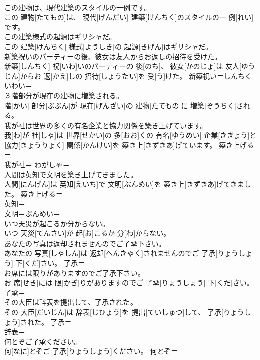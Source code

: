 \documentclass[8pt]{extreport}
\begin{document}
\begin{CJK}{UTF8}{min}
\\	この建物は、現代建築のスタイルの一例です。	
\\	この 建物[たてもの]は、 現代[げんだい] 建築[けんちく]のスタイルの一 例[れい]です。	
\\	この建築様式の起源はギリシャだ。	
\\	この 建築[けんちく] 様式[ようしき]の 起源[きげん]はギリシャだ。	
\\	新築祝いのパーティーの後、彼女は友人からお返しの招待を受けた。	
\\	新築[しんちく] 祝[いわ]いのパーティーの 後[のち]、 彼女[かのじょ]は 友人[ゆうじん]からお 返[かえ]しの 招待[しょうたい]を 受[う]けた。	新築祝い＝しんちくいわい＝ 
\\	３階部分が現在の建物に増築される。	
\\	階[かい] 部分[ぶぶん]が 現在[げんざい]の 建物[たてもの]に 増築[ぞうちく]される。	
\\	我が社は世界の多くの有名企業と協力関係を築き上げています。	
\\	我[わ]が 社[しゃ]は 世界[せかい]の 多[おお]くの 有名[ゆうめい] 企業[きぎょう]と 協力[きょうりょく] 関係[かんけい]を 築き上[きずきあ]げています。	築き上げる＝ 
\\	我が社＝ わがしゃ＝ 
\\	人間は英知で文明を築き上げてきました。	
\\	人間[にんげん]は 英知[えいち]で 文明[ぶんめい]を 築き上[きずきあ]げてきました。	築き上げる＝ 
\\	英知＝ 
\\	文明＝ぶんめい＝ 
\\	いつ天災が起こるか分からない。	
\\	いつ 天災[てんさい]が 起[お]こるか 分[わ]からない。	
\\	あなたの写真は返却されませんのでご了承下さい。	
\\	あなたの 写真[しゃしん]は 返却[へんきゃく]されませんのでご 了承[りょうしょう] 下[くだ]さい。	了承＝ 
\\	お席には限りがありますのでご了承下さい。	
\\	お 席[せき]には 限[かぎ]りがありますのでご 了承[りょうしょう] 下[くだ]さい。	了承＝ 
\\	その大臣は辞表を提出して、了承された。	
\\	その 大臣[だいじん]は 辞表[じひょう]を 提出[ていしゅつ]して、 了承[りょうしょう]された。	了承＝ 
\\	辞表＝ 
\\	何とぞご了承ください。	
\\	何[なに]とぞご 了承[りょうしょう]ください。	何とぞ＝ 

\end{CJK}
\end{document}
